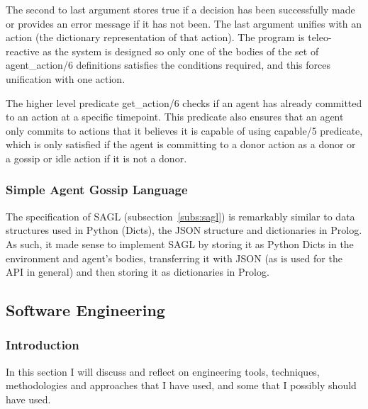 \documentclass[]{final_report}
\begin{document}
The second to last argument stores true if a decision has been successfully made or provides an error message if it has not been. The last argument unifies with an action (the dictionary representation of that action). The program is teleo-reactive as the system is designed so only one of the bodies of the set of agent\_action/6 definitions satisfies the conditions required, and this forces unification with one action.\par 
The higher level predicate get\_action/6 checks if an agent has already committed to an action at a specific timepoint. This predicate also ensures that an agent only commits to actions that it believes it is capable of using capable/5 predicate, which is only satisfied if the agent is committing to a donor action as a donor or a gossip or idle action if it is not a donor.

\subsubsection{Simple Agent Gossip Language}
The specification of SAGL (subsection~\ref{subs:sagl}) is remarkably similar to data structures used in Python (Dicts), the JSON structure and dictionaries in Prolog. As such, it made sense to implement SAGL by storing it as Python Dicts in the environment and agent's bodies, transferring it with JSON (as is used for the API in general) and then storing it as dictionaries in Prolog. 

\subsection{Software Engineering}
\subsubsection{Introduction}
In this section I will discuss and reflect on engineering tools, techniques, methodologies and approaches that I have used, and some that I possibly should have used.
\end{document}
